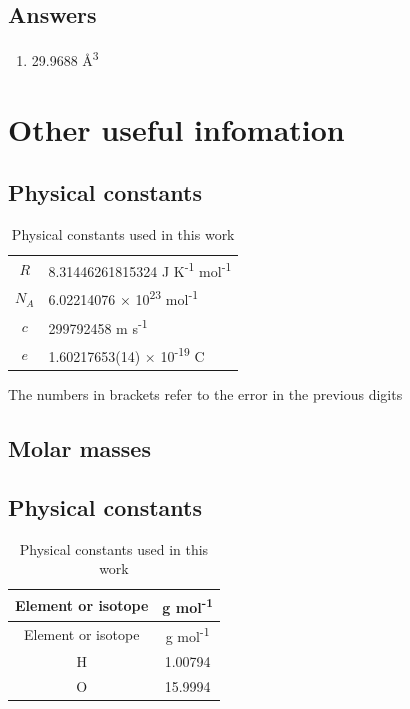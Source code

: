 \documentclass[
]{book}
\providecommand{\tightlist}{%
  \setlength{\itemsep}{0pt}\setlength{\parskip}{0pt}}
\begin{document}
\hypertarget{answers}{%
\section{Answers}\label{answers}}

\begin{enumerate}
\def\labelenumi{\arabic{enumi}.}
\tightlist
\item
  29.9688 Å\textsuperscript{3}
\end{enumerate}

\hypertarget{other-useful-infomation}{%
\chapter{Other useful infomation}\label{other-useful-infomation}}

\hypertarget{physical-constants}{%
\section{Physical constants}\label{physical-constants}}

\begin{longtable}[]{@{}cl@{}}
\caption{Physical constants used in this work\label{tab:physicalconst}}\tabularnewline
\toprule
\endhead
\(R\) & 8.31446261815324 J K\textsuperscript{-1} mol\textsuperscript{-1}\tabularnewline
\(N_A\) & 6.02214076 × 10\textsuperscript{23} mol\textsuperscript{-1}\tabularnewline
\(c\) & 299792458 m s\textsuperscript{-1}\tabularnewline
\(e\) & 1.60217653(14) × 10\textsuperscript{-19} C\tabularnewline
\bottomrule
\end{longtable}

The numbers in brackets refer to the error in the previous digits

\hypertarget{molar-masses}{%
\section{Molar masses}\label{molar-masses}}

\hypertarget{physical-constants-1}{%
\section{Physical constants}\label{physical-constants-1}}

\begin{longtable}[]{@{}cc@{}}
\caption{Physical constants used in this work\label{tab:physicalconst}}\tabularnewline
\toprule
Element or isotope & g mol\textsuperscript{-1}\tabularnewline
\midrule
\endfirsthead
\toprule
Element or isotope & g mol\textsuperscript{-1}\tabularnewline
\midrule
\endhead
H & 1.00794\tabularnewline
O & 15.9994\tabularnewline
\bottomrule
\end{longtable}
\end{document}

